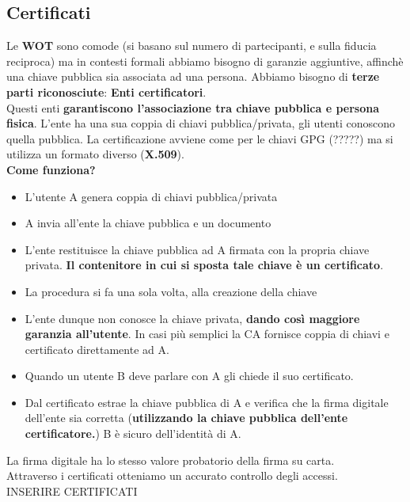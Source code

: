 \documentclass[12pt]{article}
\begin{document}
		\subsection{Certificati}
			Le \textbf{WOT} sono comode (si basano sul numero di partecipanti, e sulla fiducia reciproca) ma in contesti formali abbiamo bisogno di garanzie aggiuntive, affinchè una chiave pubblica sia associata ad una persona. Abbiamo bisogno di \textbf{terze parti riconosciute}: \textbf{Enti certificatori}.\\
			Questi enti \textbf{garantiscono l'associazione tra chiave pubblica e persona fisica}. L'ente ha una sua coppia di chiavi pubblica/privata, gli utenti conoscono quella pubblica. La certificazione avviene come per le chiavi GPG (?????) ma si utilizza un formato diverso (\textbf{X.509}). \\
			\textbf{Come funziona?}
			\begin{itemize}
				\item L'utente A genera coppia di chiavi pubblica/privata
				\item A invia all'ente la chiave pubblica e un documento
				\item L'ente restituisce la chiave pubblica ad A firmata con la propria chiave privata. \textbf{Il contenitore in cui si sposta tale chiave è un certificato}.
				\item La procedura si fa una sola volta, alla creazione della chiave
				\item L'ente dunque non conosce la chiave privata, \textbf{dando così maggiore garanzia all'utente}. In casi più semplici la CA fornisce coppia di chiavi e certificato direttamente ad A.
				\item Quando un utente B deve parlare con A gli chiede il suo certificato.
				\item Dal certificato estrae la chiave pubblica di A e verifica che la firma digitale dell'ente sia corretta (\textbf{utilizzando la chiave pubblica dell'ente certificatore.}) B è sicuro dell'identità di A.
			\end{itemize}
			La firma digitale ha lo stesso valore probatorio della firma su carta.\\
			Attraverso i certificati otteniamo un accurato controllo degli accessi.\\
			
			INSERIRE CERTIFICATI\\
\end{document}

